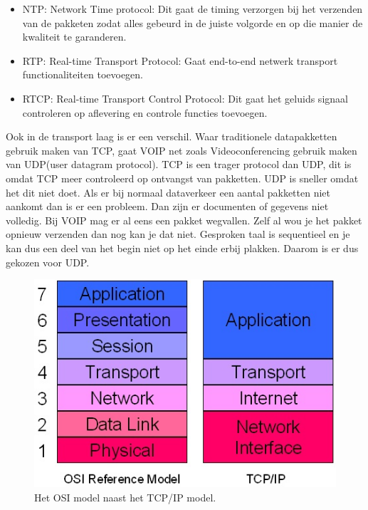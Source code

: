 \documentclass[pdftex,a4paper,12pt,twoside]{report}
\begin{document}
\begin{itemize}
	\item NTP: Network Time protocol: Dit gaat de timing verzorgen bij het verzenden van de pakketen zodat alles gebeurd in de juiste volgorde en op die manier de kwaliteit te garanderen.
	\item RTP: Real-time Transport Protocol: Gaat end-to-end netwerk transport functionaliteiten toevoegen.
	\item RTCP: Real-time Transport Control Protocol: Dit gaat het geluids signaal controleren op aflevering en controle functies toevoegen.
\end{itemize}

Ook in de transport laag is er een verschil. Waar traditionele datapakketten gebruik maken van TCP, gaat VOIP net zoals Videoconferencing gebruik maken van UDP(user datagram protocol). TCP is een trager protocol dan UDP, dit is omdat TCP meer controleerd op ontvangst van pakketten. UDP is sneller omdat het dit niet doet. 
Als er bij normaal dataverkeer een aantal pakketten niet aankomt dan is er een probleem. Dan zijn er documenten of gegevens niet volledig. Bij VOIP mag er al eens een pakket wegvallen. Zelf al wou je het pakket opnieuw verzenden dan nog kan je dat niet. Gesproken taal is sequentieel en je kan dus een deel van het begin niet op het einde erbij plakken.
Daarom is er dus gekozen voor UDP. 



\begin{figure}[h]
\caption{Het OSI model naast het TCP/IP model.}
\includegraphics[scale=0.8]{img/TCP}
\end{figure}


\newpage
\end{document}
